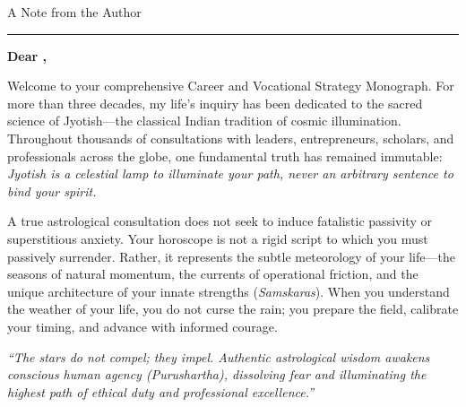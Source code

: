 \begin{minipage}[t]{0.66\linewidth}
  \vspace{0pt}
  {\sffamily\fontsize{8}{10}\selectfont\bfseries\color{AccentGold}}\par
  \vspace{1.5mm}
  {\displayfont\fontsize{20}{24}\selectfont\color{ExecutiveNavy}A Note from the Author\par}
  \vspace{1.2mm}
  {\textcolor{AccentGold}{\rule{34mm}{0.8pt}}}\par
  \vspace{3.5mm}

  {\fontsize{9.5}{13.8}\selectfont\bfseries\color{DeepSlate}
  Dear \ClientName,\par}
  \vspace{2mm}

  {\fontsize{9}{13}\selectfont
  Welcome to your comprehensive Career and Vocational Strategy Monograph. For more than three decades, my life's inquiry has been dedicated to the sacred science of Jyotish---the classical Indian tradition of cosmic illumination. Throughout thousands of consultations with leaders, entrepreneurs, scholars, and professionals across the globe, one fundamental truth has remained immutable: \textit{Jyotish is a celestial lamp to illuminate your path, never an arbitrary sentence to bind your spirit.}}\par
  \vspace{2mm}

  {\fontsize{9}{13}\selectfont
  A true astrological consultation does not seek to induce fatalistic passivity or superstitious anxiety. Your horoscope is not a rigid script to which you must passively surrender. Rather, it represents the subtle meteorology of your life---the seasons of natural momentum, the currents of operational friction, and the unique architecture of your innate strengths (\textit{Samskaras}). When you understand the weather of your life, you do not curse the rain; you prepare the field, calibrate your timing, and advance with informed courage.}\par
  \vspace{2.5mm}

  \begin{tcolorbox}[
    enhanced,
    colback=GoldTint,
    colframe=AccentGold!50,
    boxrule=0.6pt,
    arc=1.5mm,
    left=3.5mm,right=3.5mm,top=3mm,bottom=3mm,
    borderline west={2.5pt}{0pt}{AccentGold}
  ]
    {\displayfont\fontsize{9.5}{13.5}\selectfont\itshape\color{ExecutiveNavy}``The stars do not compel; they impel. Authentic astrological wisdom awakens conscious human agency (\textit{Purushartha}), dissolving fear and illuminating the highest path of ethical duty and professional excellence.''}
    \vspace{1.5mm}
  \end{tcolorbox}
  \vspace{2mm}


\end{minipage}
